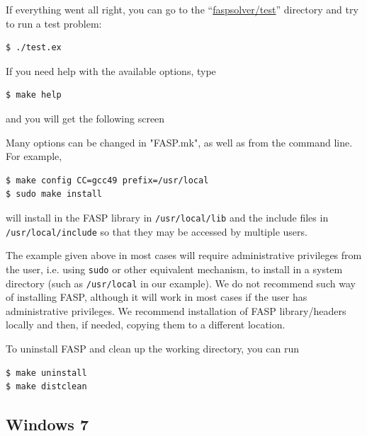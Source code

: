 \documentclass[11pt]{memoir}
\begin{document}
If everything went all right, you can go to the
``\url{faspsolver/test}'' directory and try to run a test problem:
%
\begin{lstlisting}[numbers=none]
$ ./test.ex
\end{lstlisting}
%
If you need help with the available options, type 
%
\begin{lstlisting}[numbers=none]
$ make help
\end{lstlisting}
%
and you will get the following screen


Many options can be changed in "FASP.mk", as well as from the command
line. For example,
\begin{lstlisting}[numbers=none]
$ make config CC=gcc49 prefix=/usr/local
$ sudo make install
\end{lstlisting}
will install in the FASP library in \verb|/usr/local/lib| and the
include files in \verb|/usr/local/include| so that they may be
accessed by multiple users.

\begin{snugshade}\noindent
  The example given above in most cases will require administrative
  privileges from the user, i.e. using \verb|sudo| or other equivalent
  mechanism, to install in a system directory (such as
  \verb|/usr/local| in our example). We do not recommend such way of
  installing FASP, although it will work in most cases if the user has
  administrative privileges.  We recommend installation of FASP
  library/headers locally and then, if needed, copying them to a
  different location.
\end{snugshade}

To uninstall FASP and clean up the working directory, you can run
%
\begin{lstlisting}[numbers=none]
$ make uninstall
$ make distclean
\end{lstlisting}
%

\subsection{Windows 7}
\end{document}
